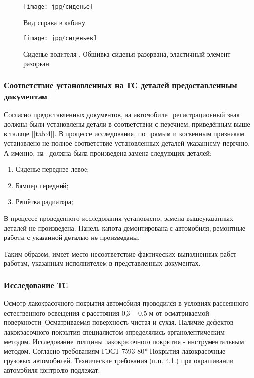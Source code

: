 {   
   
   
   
   
   \begin{figure}[H]\centering
   	\parbox[t]{0.49\textwidth}
   	{\centering
   		\texttt{[image: jpg/сиденье]}
   		\caption{\footnotesize {Вид справа в кабину }}
   		\label{кабинасправа}}
   	\hfil \hfil
   	\parbox[t]{0.49\textwidth}
   	{\centering
   		\texttt{[image: jpg/сиденьев]}
   		\caption{\footnotesize {Сиденье водителя \tc. Обшивка сиденья разорвана, эластичный элемент разорван}}
   		\label{сиденьеводителя}}
   \end{figure}
   
   
   
   
   
   
\subsubsection{Соответствие установленных на ТС деталей предоставленным документам}

Согласно предоставленных документов, на автомобиле \, регистрационный знак \, должны были установлены детали в соответствии с перечнем, приведённым выше  в талице [\ref{tab:4}]. В процессе исследования, по прямым и косвенным признакам установлено не полное соответствие установленных деталей указанному перечню. А именно, на \,  должна была произведена замена следующих деталей:
\begin{enumerate}
	\item Сиденье переднее левое;
	\item Бампер передний;
	\item Решётка радиатора;
\end{enumerate}
  В процессе проведенного исследования установлено,   замена вышеуказанных деталей не произведена. Панель капота демонтирована с автомобиля,  ремонтные работы с указанной деталью не произведены. 
   
   Таким образом,   имеет место несоответствие фактических выполненных работ работам, указанным исполнителем в представленных документах.
     
      
   \subsubsection{Исследование  ТС  }
   
   \indent Осмотр лакокрасочного покрытия автомобиля проводился в условиях рассеянного естественного освещения с расстояния  0,3 -- 0,5 м от осматриваемой поверхности. Осматриваемая поверхность чистая  и сухая.
   Наличие дефектов лакокрасочного покрытия специалистом определялись органолептическим методом. Исследование толщины лакокрасочного покрытия - инструментальным методом. 
   Согласно требованиям ГОСТ 7593-80* Покрытия лакокрасочные грузовых автомобилей. Технические требования (п.п. 4.1.)  при окрашивании автомобиля контролю подлежат:\\
   
}
